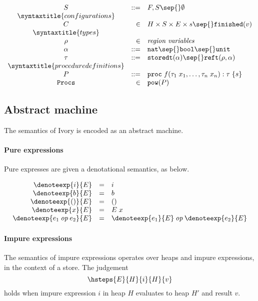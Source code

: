 \[\begin{array}{crl}
S & ::= & F, S \sep{} \emptyset{} \\
\syntaxtitle{configurations}\\
C & \in & H \times S \times E \times s \sep{} \texttt{finished}(v) \\
\syntaxtitle{types}\\
\rho   & \in & \textit{region variables}\\
\alpha & ::= & \texttt{nat} \sep{} \texttt{bool} \sep{} \texttt{unit} \\
\tau   & ::= & \texttt{storedt}(\alpha) \sep{} \texttt{reft}(\rho, \alpha) \\
\syntaxtitle{procedure definitions}\\
P & ::= & \texttt{proc\;} f(\tau_1\;x_1, \ldots{}, \tau_n\;x_n) : \tau\; \{ s \} \\
\texttt{Procs} & \in & \texttt{pow}(P)
\end{array}
\]

\subsection{Abstract machine}

The semantics of Ivory is encoded as an abstract machine.  

\paragraph{Pure expressions} Pure expresses are given a denotational semantics, as below.

\[
\begin{array}{rcl}
\denoteexp{i}{E}  &=&i \\
\denoteexp{b}{E}  &=&b \\
\denoteexp{()}{E} &=&() \\
\denoteexp{x}{E}  &=&E\;x \\
\denoteexp{e_1 \mathbin{\mathit{op}} e_2}{E} &=& \denoteexp{e_1}{E} \mathbin{\mathit{op}} \denoteexp{e_2}{E} \\
\end{array}
\]

\paragraph{Impure expressions}
The semantics of impure expressions operates over heaps and impure expressions, in the context of a
store.  The judgement
\[
\hsteps{E}{H}{i}{H}{v}
\]
holds when impure expression $i$ in heap $H$ evaluates to heap $H'$ and result $v$.

